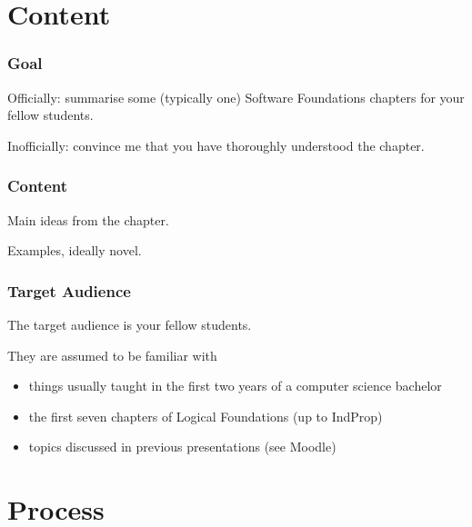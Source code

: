 \section{Content}

\begin{frame}
  \frametitle{Goal}

  Officially: summarise some (typically one) Software Foundations chapters for your fellow students.

  \medskip
  \pause

  Inofficially: convince me that you have thoroughly understood the chapter.
\end{frame}

\begin{frame}
  \frametitle{Content}

  Main ideas from the chapter.

  \medskip
  \pause

  Examples, ideally novel.
\end{frame}

\begin{frame}
  \frametitle{Target Audience}

  The target audience is your fellow students.

  \medskip
  \pause

  They are assumed to be familiar with
  \begin{itemize}
    \item things usually taught in the first two years of a computer science bachelor
    \item the first seven chapters of Logical Foundations (up to IndProp)
    \item topics discussed in previous presentations (see Moodle)
  \end{itemize}
\end{frame}

\section{Process}

